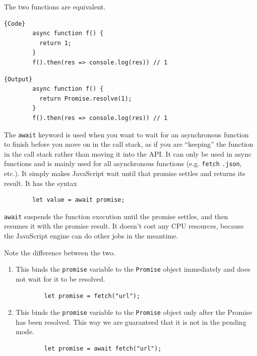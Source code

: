 \documentclass{article}
\begin{document}
    \begin{example}
      The two functions are equivalent. 

      \noindent\begin{minipage}{.5\textwidth}
      \begin{lstlisting}[]{Code}
        async function f() {
          return 1; 
        }
        f().then(res => console.log(res)) // 1
      \end{lstlisting}
      \end{minipage}
      \hfill
      \begin{minipage}{.49\textwidth}
      \begin{lstlisting}[]{Output}
        async function f() {
          return Promise.resolve(1); 
        }
        f().then(res => console.log(res)) // 1
      \end{lstlisting}
      \end{minipage}
    \end{example}

    \begin{definition}
      The \texttt{await} keyword is used when you want to wait for an asynchronous function to finish before you move on in the call stack, as if you are ``keeping'' the function in the call stack rather than moving it into the API. It can only be used in async functions and is mainly used for all asynchronous functions (e.g. \texttt{fetch} \texttt{.json}, etc.). It simply makes JavaScript wait until that promise settles and returns its result. It has the syntax 
      \begin{lstlisting}
        let value = await promise; 
      \end{lstlisting}
      \texttt{await} suspends the function execution until the promise settles, and then resumes it with the promise result. It doesn't cost any CPU resources, because the JavaScript engine can do other jobs in the meantime. 
    \end{definition}

    Note the difference between the two. 
    \begin{enumerate}
      \item This binds the \texttt{promise} variable to the \texttt{Promise} object immediately and does not wait for it to be resolved. 
      \begin{lstlisting}
        let promise = fetch("url"); 
      \end{lstlisting}

      \item This binds the \texttt{promise} variable to the \texttt{Promise} object only after the Promise has been resolved. This way we are guaranteed that it is not in the pending mode. 
      \begin{lstlisting}
        let promise = await fetch("url"); 
      \end{lstlisting}
    \end{enumerate}
\end{document}
